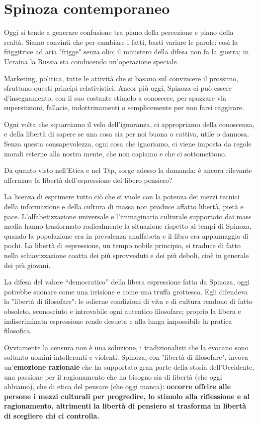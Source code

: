 \chapter{Spinoza contemporaneo}

Oggi si tende a generare confusione tra piano della percezione e piano della realtà. Siamo convinti che per cambiare i fatti, basti variare le parole: così la friggitrice ad aria "frigge" senza olio; il ministero della difesa non fa la guerra; in Ucraina la Russia sta conducendo un'operazione speciale.

Marketing, politica, tutte le attività che si basano sul convincere il prossimo, sfruttano questi principi relativistici. Ancor più oggi, Spinoza ci può essere d'insegnamento, con il suo costante stimolo a conoscere, per spazzare via superstizioni, fallacie, indottrinamenti o semplicemente per non farsi raggirare.

Ogni volta che squarciamo il velo dell'ignoranza, ci appropriamo della conoscenza, e della libertà di sapere se una cosa sia per noi buona o cattiva, utile o dannosa. Senza questa consapevolezza, ogni cosa che ignoriamo, ci viene imposta da regole morali esterne alla nostra mente, che non capiamo e che ci sottomettono.

Da quanto visto nell'Etica e nel Ttp, sorge adesso la domanda: è ancora rilevante affermare la libertà dell'espressione del libero pensiero? 

La licenza di
esprimere tutto ciò che si vuole con la potenza dei mezzi tecnici della informazione e della
cultura di massa non produce affatto libertà, pietà e pace. L'alfabetizzazione universale e
l'immaginario culturale supportato dai mass media hanno
trasformato radicalmente la situazione rispetto ai tempi di Spinoza, quando la popolazione era in
prevalenza analfabeta e il libro era appannaggio di pochi. La libertà di espressione, un tempo nobile
principio, si traduce di fatto nella schiavizzazione coatta dei
più sprovveduti e dei più deboli, cioè in generale dei più giovani.

La difesa del valore
“democratico” della libera espressione fatta da Spinoza, oggi potrebbe suonare come una irrisione e come una truffa grottesca. Egli  difendeva la "libertà di filosofare": le
odierne condizioni di vita e di cultura rendono di fatto obsoleto, sconosciuto e introvabile
ogni autentico filosofare; proprio la libera e indiscriminata espressione
rende desueta e alla lunga impossibile la pratica filosofica.

Ovviamente la censura non è una soluzione, i tradizionalisti che la evocano sono soltanto uomini intolleranti e violenti. Spinoza, con "libertà di filosofare", invoca un'\textbf{emozione razionale} che ha supportato gran parte della storia
dell'Occidente, una passione per il ragionamento che ha bisogno sia di libertà (che oggi abbiamo), che di etica del pensare (che oggi manca): \textbf{occorre offrire alle persone i mezzi culturali per progredire, lo stimolo alla riflessione e al ragionamento, altrimenti la libertà di pensiero si trasforma in libertà di scegliere chi ci controlla.}

